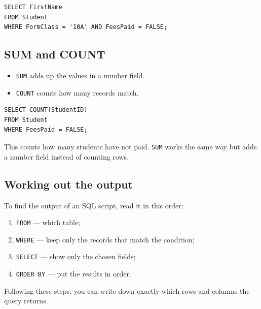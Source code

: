 \documentclass[11pt]{article}
\begin{document}
\begin{Verbatim}
SELECT FirstName
FROM Student
WHERE FormClass = '10A' AND FeesPaid = FALSE;
\end{Verbatim}

\subsection*{SUM and COUNT}

\begin{itemize}
\item \texttt{SUM} adds up the values in a number field.

\item \texttt{COUNT} counts how many records match.

\end{itemize}

\begin{Verbatim}
SELECT COUNT(StudentID)
FROM Student
WHERE FeesPaid = FALSE;
\end{Verbatim}

This counts how many students have not paid. \texttt{SUM} works the same way but adds a number field instead of counting rows.

\subsection*{Working out the output}

To find the output of an SQL script, read it in this order:

\begin{enumerate}
\item \texttt{FROM} — which table;

\item \texttt{WHERE} — keep only the records that match the condition;

\item \texttt{SELECT} — show only the chosen fields;

\item \texttt{ORDER BY} — put the results in order.

\end{enumerate}

Following these steps, you can write down exactly which rows and columns the query returns.
\end{document}
